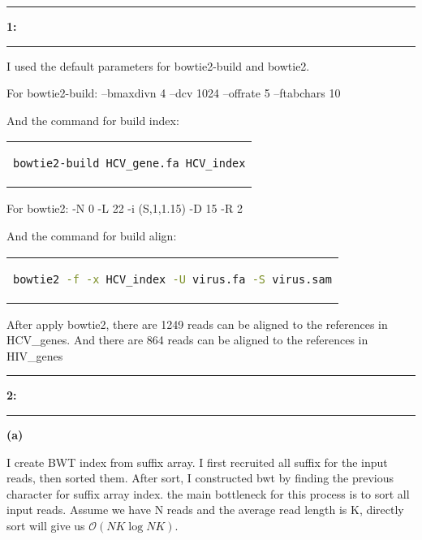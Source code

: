 \documentclass[11pt]{article}
\newcommand\question[2]{\vspace{.25in}\hrule\textbf{#1: #2}\vspace{.5em}\hrule\vspace{.10in}}
\renewcommand\part[1]{\vspace{.10in}\textbf{(#1)}}
\begin{document}
\raggedright
\newcommand\NAME{Nan Du}  %
\newcommand\ANDREWID{dunan}     %
\newcommand\HWNUM{ Final Project}              %


\question{1}{} 

I used the default parameters for bowtie2-build and bowtie2.

For bowtie2-build:
--bmaxdivn 4
--dcv 1024
--offrate 5
--ftabchars 10

And the command for build index:
\begin{center}
	\begin{tabular}{c}
		\begin{lstlisting}[language=bash]
bowtie2-build HCV_gene.fa HCV_index
		\end{lstlisting}
	\end{tabular}
\end{center}


For bowtie2:
-N 0
-L 22
-i (S,1,1.15)
-D 15
-R 2


And the command for build align:
\begin{center}
	\begin{tabular}{c}
		\begin{lstlisting}[language=bash]
bowtie2 -f -x HCV_index -U virus.fa -S virus.sam
		\end{lstlisting}
	\end{tabular}
\end{center}


After apply bowtie2, there are 1249 reads can be aligned to the references in HCV\_genes. And there are 864 reads can be aligned to the references in HIV\_genes

\question{2}{}





\part{a}

I create BWT index from suffix array. I first recruited all suffix for the input reads, then sorted them. After sort, I constructed bwt by finding the previous character for suffix array index. the main bottleneck for this process is to sort all input reads. Assume we have N reads and the average read length is K, directly sort will give us $\mathcal{O}(NK\log NK ) $. 
\end{document}
